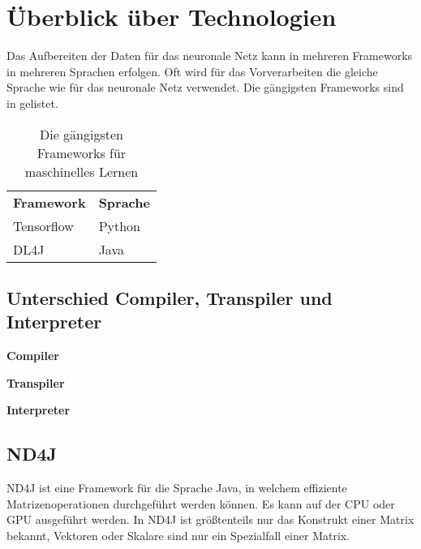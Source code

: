 
\chapter{Überblick über Technologien}

Das Aufbereiten der Daten für das neuronale Netz kann in mehreren Frameworks in mehreren Sprachen erfolgen.
Oft wird für das Vorverarbeiten die gleiche Sprache wie für das neuronale Netz verwendet.
Die gängigsten Frameworks sind in  gelistet.

\begin{table}[H]
	\centering
	\begin{tabular}{ | p{3cm} | p{3cm} | }
		\hline \rowcolor{gray!15}
		\textbf{Framework} & \textbf{Sprache} \\ \hhline{|=|=|}
		Tensorflow & Python \\ \hline
		DL4J & Java \\ \hline
	\end{tabular}
	\caption{Die gängigsten Frameworks für maschinelles Lernen}
	\label{tab:Frameworks}
\end{table}

\section{Unterschied Compiler, Transpiler und Interpreter}
\begin{description}
	\item{\textbf{Compiler}}
	\item{\textbf{Transpiler}}
	\item{\textbf{Interpreter}}
\end{description}

\section{ND4J}
ND4J ist eine Framework für die Sprache Java, in welchem effiziente Matrizenoperationen durchgeführt werden können.
Es kann auf der \ac{CPU} oder \ac{GPU} ausgeführt werden.
In ND4J ist größtenteils nur das Konstrukt einer Matrix bekannt, Vektoren oder Skalare sind nur ein Spezialfall einer Matrix.

\endinput
